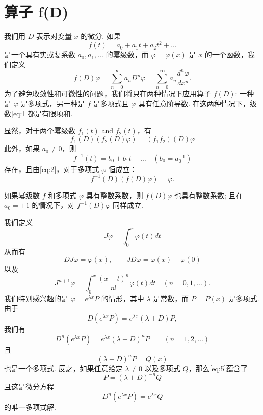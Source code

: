 \section{算子 f(D)}

我们用 $D$ 表示对变量 $x$ 的微分. 如果
\[ f(t) = a_0 + a_1 t + a_2 t^2 + \dots \]
是一个具有实或复系数 $a_0, a_1, \dots$ 的幂级数，而 $\varphi = \varphi(x)$ 是 $x$ 的一个函数，我们定义
\begin{equation} f(D)\varphi = \sum_{n=0}^{\infty} a_n D^n \varphi = \sum_{n=0}^{\infty} a_n \frac{d^n \varphi}{dx^n}. \tag{1}\label{eq:1} \end{equation}
为了避免收敛性和可微性的问题，我们将只在两种情况下应用算子 $f(D)$: 一种是 $\varphi$ 是多项式，另一种是 $f$ 是多项式且 $\varphi$ 具有任意阶导数. 在这两种情况下，级数\eqref{eq:1}都是有限项和.

显然，对于两个幂级数 $f_1(t)$ and $f_2(t)$，有
\begin{equation} f_1(D)(f_2(D)\varphi) = (f_1 f_2)(D)\varphi \tag{2}\label{eq:2} \end{equation}
此外，如果 $a_0 \neq 0$，则
\[ f^{-1}(t) = b_0 + b_1 t + \dots \quad (b_0 = a_0^{-1}) \]
存在，且由\eqref{eq:2}，对于多项式 $\varphi$ 恒成立：
\[ f^{-1}(D)(f(D)\varphi) = \varphi. \]

如果幂级数 $f$ 和多项式 $\varphi$ 具有整数系数，则 $f(D)\varphi$ 也具有整数系数; 且在 $a_0 = \pm 1$ 的情况下，对 $f^{-1}(D)\varphi$ 同样成立.

我们定义
\[ J \varphi = \int_0^x \varphi(t) dt \]
从而有
\[ D J \varphi = \varphi(x), \qquad J D \varphi = \varphi(x) - \varphi(0) \]
以及
\begin{equation} J^{n+1} \varphi = \int_0^x \frac{(x-t)^n}{n!} \varphi(t) dt \quad (n = 0,1,\dots). \tag{3}\label{eq:3} \end{equation}
我们特别感兴趣的是 $\varphi = e^{\lambda x} P$ 的情形，其中 $\lambda$ 是常数，而 $P = P(x)$ 是多项式. 由于
\[ D(e^{\lambda x} P) = e^{\lambda x} (\lambda + D)P, \]
我们有
\begin{equation} D^{n}(e^{\lambda x}P) = e^{\lambda x}(\lambda + D)^{n}P \qquad (n=1,2,\dots) \tag{4}\label{eq:4} \end{equation}
且
\begin{equation} (\lambda + D)^{n}P = Q(x) \tag{5}\label{eq:5} \end{equation}
也是一个多项式. 反之，如果任意给定 $\lambda \neq 0$ 以及多项式 $Q$，那么\eqref{eq:5}蕴含了
\[ P = (\lambda + D)^{-n}Q \]
且这是微分方程
\[ D^{n}(e^{\lambda x}P) = e^{\lambda x}Q \]
的唯一多项式解.

